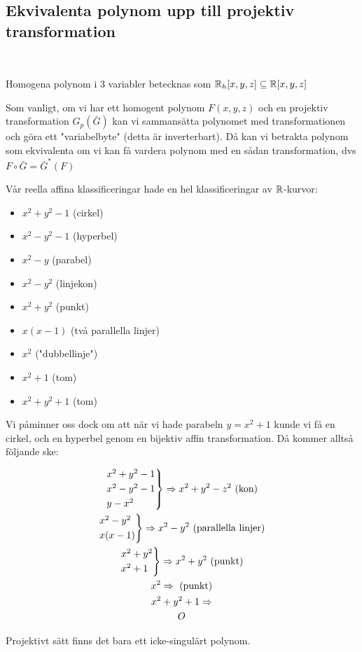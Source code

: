 \subsection{Ekvivalenta polynom upp till projektiv transformation}\hfill\\\par
\noindent Homogena polynom i 3 variabler betecknas som $\mathbb{R}_h[x,y,z]\subseteq\mathbb{R}[x,y,z]$
\par\bigskip
\noindent Som vanligt, om vi har ett homogent polynom $F(x,y,z)$ och en projektiv transformation $G_p(\bar{G})$ kan vi sammansätta polynomet med transformationen och göra ett "variabelbyte" (detta är inverterbart). Då kan vi betrakta polynom som ekvivalenta om vi kan få vardera polynom med en sådan transformation, dvs $F\circ\bar{G} = \bar{G}^*(F)$
\par\bigskip
\noindent Vår reella affina klassificeringar hade en hel klassificeringar av $\mathbb{R}$-kurvor: 
\begin{itemize}
  \item $x^2+y^2-1$ (cirkel)
  \item $x^2-y^2-1$ (hyperbel)
  \item $x^2-y$ (parabel)
  \item $x^2-y^2$ (linjekon)
  \item $x^2+y^2$ (punkt)
  \item$x(x-1)$ (två parallella linjer)
  \item $x^2$ ("dubbellinje")
  \item $x^2+1$ (tom)
  \item $x^2+y^2+1$ (tom)
\end{itemize}
\par\bigskip
\noindent Vi påminner oss dock om att när vi hade parabeln $y=x^2+1$ kunde vi få en cirkel, och en hyperbel genom en bijektiv affin transformation. Då kommer alltså följande ske:\par
\begin{equation*}
  \begin{gathered}
    \begin{rcases*}
      x^2+y^2-1\\
      x^2-y^2-1\\
      y-x^2
    \end{rcases*}\Rightarrow x^2+y^2-z^2\text{ (kon)}\\
    \begin{rcases*}
      x^2-y^2\\
      x(x-1)
    \end{rcases*}\Rightarrow x^2-y^2\text{ (parallella linjer)}\\
    \begin{rcases*}
      x^2+y^2\\
      x^2+1
    \end{rcases*}\Rightarrow x^2+y^2 \text{ (punkt)}\\
    x^2\Rightarrow\text{ (punkt)}\\
    x^2+y^2+1\Rightarrow\\O
  \end{gathered}
\end{equation*}
\par\bigskip
\noindent Projektivt sätt finns det bara ett icke-singulärt polynom.
\par\bigskip
